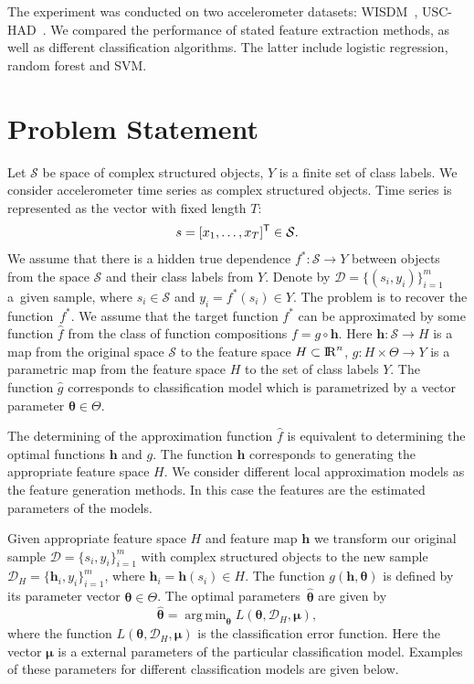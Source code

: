\documentclass{llncs}
\DeclareMathOperator*{\argmin}{arg\,min}
\newcommand{\T}{{\mbox{\scriptsize\sffamily\upshape\mdseries T}}}
\begin{document}
The experiment was conducted on two accelerometer datasets: WISDM~\cite{wisdm}, USC-HAD~\cite{usc}. 
We compared the performance of stated feature extraction methods, as well as different classification algorithms. 
The latter include logistic regression, random forest and SVM.


\section{Problem Statement}
Let $\mathcal{S}$ be space of complex structured objects, $Y$ is a finite set of class labels. 
We consider accelerometer time series as complex structured objects. Time series is represented as the vector with fixed length $T$:
\begin{equation}
s = [x_1, \dots, x_T]^{\T} \in \mathcal{S}.
\label{eq::time_series}
\end{equation}
We assume that there is a hidden true dependence $f^*: \mathcal{S} \rightarrow Y$ between objects from the space $\mathcal{S}$ and their class labels from $Y$.
Denote by $\mathcal{D} = \{(s_i, y_i)\}_{i=1}^m$ a~given sample, where $s_i \in \mathcal{S}$ and $y_i = f^*(s_i)\in Y$.
The problem is to recover the function~$f^*$. 
We assume that the target function $f^*$ can be approximated by some function $\hat{f}$ from the class of function compositions $f = g \circ \bm{h}$. 
Here $\bm{h}: \mathcal{S} \rightarrow H$ is a map from the original space $\mathcal{S}$ to the feature space $H \subset {\rm I\!R}^n$,
$g: H \times \Theta \rightarrow Y$ is a parametric map from the feature space $H$ to the set of class labels $Y$. 
The function $\hat{g}$ corresponds to classification model which is parametrized by a vector parameter $\boldsymbol{\theta} \in \Theta$. 

The determining of the approximation function $\hat{f}$ is equivalent to determining the optimal functions $\bm{h}$ and  $g$. 
The function $\bm{h}$ corresponds to generating the appropriate feature space $H$. 
We consider different local approximation models as the feature generation methods. 
In this case the features are the estimated parameters of the models.

Given appropriate feature space $H$ and feature map $\bm{h}$ we transform our original sample $\mathcal{D} = \{s_i, y_i\}_{i=1}^m$ with complex structured objects to the new sample $\mathcal{D}_H = \{\mathbf{h}_i, y_i\}_{i=1}^m$, where $\mathbf{h}_i = \bm{h}(s_i) \in H$. 
The function $g(\mathbf{h}, \bm{\theta})$ is defined by its parameter vector $\bm{\theta} \in \Theta$. 
The optimal parameters~$\hat{\bm{\theta}}$ are given by
\begin{equation}
\hat{\bm{\theta}} = \argmin_{\bm{\theta}} L(\bm{\theta}, \mathcal{D}_H, \bm{\mu}),
\label{eq::optimal_classification_params}
\end{equation}
where the function $L(\bm{\theta}, \mathcal{D}_H, \bm{\mu})$ is the classification error function. Here the vector $\bm{\mu}$ is a external parameters of the particular classification model. Examples of these parameters for different classification models are given below.
\end{document}
